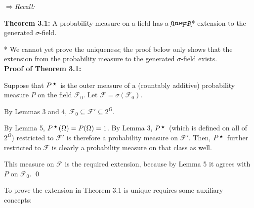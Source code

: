     $\Rightarrow$\textit{Recall:}
    \vspace{-0.75ex}
    \begin{mdframed}
        \textbf{Theorem 3.1: } A probability measure on a field has a $\xcancel{\text{unique}}$* extension to the generated $\sigma$-field.
    \end{mdframed}
    * We cannot yet prove the uniqueness; the proof below only shows that the extension from the probability measure to the generated $\sigma$-field exists.\\
    
    \textbf{Proof of Theorem 3.1: }
    \vspace{-1ex}
    \begin{proofline}
        Suppose that \( P^{\medstar} \) is the outer measure of a (countably additive) probability measure \( P \) on the field \( \mathcal{F}_0 \). Let \( \mathcal{F} = \sigma(\mathcal{F}_0) \).

        By Lemmas 3 and 4, \( \mathcal{F}_0 \subseteq \mathcal{F}' \subseteq 2^\Omega \).
        
        By Lemma 5, \( P^{\medstar}(\Omega) = P(\Omega) = 1 \). By Lemma 3, \( P^{\medstar} \) (which is defined on all of \( 2^\Omega \)) restricted to \( \mathcal{F}' \) is therefore a probability measure on \( \mathcal{F}' \). Then, \( P^{\medstar} \) further restricted to \( \mathcal{F} \) is clearly a probability measure on that class as well.
        
        This measure on \( \mathcal{F} \) is the required extension, because by Lemma 5 it agrees with \( P \) on \( \mathcal{F}_0 \). \hfill \qed
    \end{proofline}

     \quad
    
    To prove the extension in Theorem 3.1 is unique requires some auxiliary concepts:

